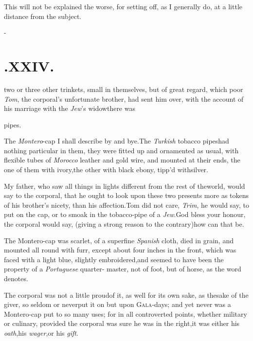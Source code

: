 \documentclass{article}
\begin{document}
This will not be explained the worse, for setting off, as I
generally do, at a little distance from the subject.

\vfill{}\eject
\null\kern-\baselineskip
\section{.\enspace XXIV.}

 two or three other trinkets,
small in themselves, but of great regard, which poor \textit{Tom},
the corporal’s unfortunate brother, had sent him over, with
the account of his marriage with the \textit{Jew}’s
widow\tsh there was

\noindent
{}\break pipes.

The \textit{Montero}-cap I shall describe by and bye.\tsk The
\textit{Turkish} tobacco pipes\break had nothing particular in them, they
were fitted up and ornamented as usual, with flexible tubes of
\textit{Morocco} leather and gold wire, and mounted at their ends,
the one of them with ivory,\tsk the other with black ebony,
tipp’d with\break silver.

My father, who saw all things in lights different from the rest
of the\break world, would say to the corporal, that he ought to look
upon these two presents more as tokens of his brother’s nicety,
than his affection.\tsh Tom did not care, \textit{Trim}, he
would say, to put on the cap, or to smoak in the tobacco-pipe of
a \textit{Jew}.\break\tsh God bless your honour, the corporal would
say, (giving a strong reason to the contrary)\tsk how can that
be.\tsh

The Montero-cap was scarlet, of a superfine \textit{Spanish}
cloth, died in grain, and mounted all round with furr, except about
four inches in the front, which was faced with a light blue,
slightly embroidered,\tsk and seemed to have been the property of
a \textit{Portuguese} quarter- master, not of foot, but of horse, as
the word denotes.

The corporal was not a little proud\break of it, as well for its own
sake, as the\break sake of the giver, so seldom or never\break put it on but
upon \textsc{Gala}-days; and yet never was a Montero-cap put
to so many uses; for in all controverted points, whether military
or culinary, provided the corporal was sure he was in the
right,\break\tsk it was either his \textit{oath},\tsk his
\textit{wager},\tsk\break or his \textit{gift}.
\end{document}
